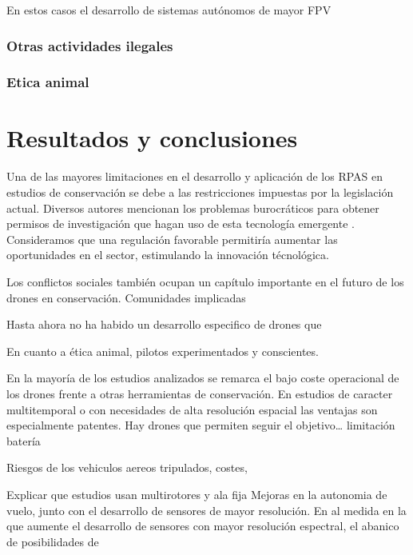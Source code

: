 \documentclass[11pt,]{article}
\begin{document}
En estos casos el desarrollo de sistemas autónomos de mayor FPV

\subsubsection{Otras actividades
ilegales}\label{otras-actividades-ilegales}

\subsubsection{Etica animal}\label{etica-animal}

\citep{Ditmer2015}

\section{Resultados y conclusiones}\label{resultados-y-conclusiones}

Una de las mayores limitaciones en el desarrollo y aplicación de los
RPAS en estudios de conservación se debe a las restricciones impuestas
por la legislación actual. Diversos autores mencionan los problemas
burocráticos para obtener permisos de investigación que hagan uso de
esta tecnología emergente \citep{FEE:FEE201513274}. Consideramos que una
regulación favorable permitiría aumentar las oportunidades en el sector,
estimulando la innovación técnológica.

Los conflictos sociales también ocupan un capítulo importante en el
futuro de los drones en conservación. Comunidades implicadas

Hasta ahora no ha habido un desarrollo especifico de drones que

En cuanto a ética animal, pilotos experimentados y conscientes.

En la mayoría de los estudios analizados se remarca el bajo coste
operacional de los drones frente a otras herramientas de conservación.
En estudios de caracter multitemporal o con necesidades de alta
resolución espacial las ventajas son especialmente patentes. Hay drones
que permiten seguir el objetivo\ldots{} limitación batería

Riesgos de los vehiculos aereos tripulados, costes,

Explicar que estudios usan multirotores y ala fija Mejoras en la
autonomia de vuelo, junto con el desarrollo de sensores de mayor
resolución. En al medida en la que aumente el desarrollo de sensores con
mayor resolución espectral, el abanico de posibilidades de
\end{document}
